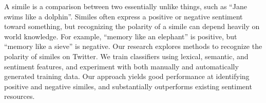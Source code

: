 A simile is a comparison between two essentially unlike things, such as ``Jane swims like a dolphin''. Similes often express a positive or negative sentiment toward something, but recognizing the polarity of a simile can depend heavily on world knowledge. For example, ``memory like an elephant'' is positive, but ``memory like a sieve'' is negative. Our research explores methods to recognize the polarity of similes on Twitter. We train classifiers using lexical, semantic, and sentiment features, and experiment with both manually and automatically generated training data. Our approach yields good performance at identifying positive and negative similes, and substantially outperforms existing sentiment resources.
